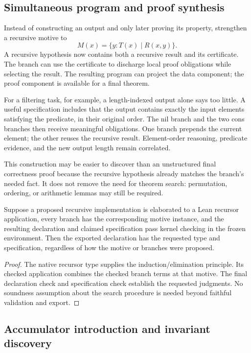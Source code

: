 \subsection{Simultaneous program and proof synthesis}

Instead of constructing an output and only later proving its property, strengthen a recursive motive to
\[
 M(x)=\{y:T(x)\mid R(x,y)\}.
\]
A recursive hypothesis now contains both a recursive result and its certificate. The branch can use the certificate to discharge local proof obligations while selecting the result. The resulting program can project the data component; the proof component is available for a final theorem.

For a filtering task, for example, a length-indexed output alone says too little. A useful specification includes that the output contains exactly the input elements satisfying the predicate, in their original order. The nil branch and the two cons branches then receive meaningful obligations. One branch prepends the current element; the other reuses the recursive result. Element-order reasoning, predicate evidence, and the new output length remain correlated.

This construction may be easier to discover than an unstructured final correctness proof because the recursive hypothesis already matches the branch's needed fact. It does not remove the need for theorem search: permutation, ordering, or arithmetic lemmas may still be required.

\begin{proposition}
Suppose a proposed recursive implementation is elaborated to a Lean recursor application, every branch has the corresponding motive instance, and the resulting declaration and claimed specification pass kernel checking in the frozen environment. Then the exported declaration has the requested type and specification, regardless of how the motive or branches were proposed.
\end{proposition}
\begin{proof}
The native recursor type supplies the induction/elimination principle. Its checked application combines the checked branch terms at that motive. The final declaration check and specification check establish the requested judgments. No soundness assumption about the search procedure is needed beyond faithful validation and export.
\end{proof}

\subsection{Accumulator introduction and invariant discovery}

